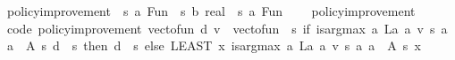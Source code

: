\begin{isabellebody}
\endisatagproof
{\isafoldproof}%
%
\isadelimproof
\isanewline
%
\endisadelimproof
\isanewline
{}\isamarkupfalse%
\ policy{\isacharunderscore}{\kern0pt}improvement{\isacharprime}{\kern0pt}\ {\isacharcolon}{\kern0pt}{\isacharcolon}{\kern0pt}\ {\isachardoublequoteopen}{\isacharparenleft}{\kern0pt}{\isacharprime}{\kern0pt}s{\isacharcomma}{\kern0pt}\ {\isacharprime}{\kern0pt}a{\isacharparenright}{\kern0pt}\ Fun\ {\isasymRightarrow}\ {\isacharparenleft}{\kern0pt}{\isacharprime}{\kern0pt}s\ {\isasymRightarrow}\isactrlsub b\ real{\isacharparenright}{\kern0pt}\ {\isasymRightarrow}\ {\isacharparenleft}{\kern0pt}{\isacharprime}{\kern0pt}s{\isacharcomma}{\kern0pt}\ {\isacharprime}{\kern0pt}a{\isacharparenright}{\kern0pt}\ Fun{\isachardoublequoteclose}\ \isanewline
\ \ \ policy{\isacharunderscore}{\kern0pt}improvement%
\isadelimproof
%
\endisadelimproof
%
\isatagproof
\isacommand{{\isachardot}{\kern0pt}}\isamarkupfalse%
%
\endisatagproof
{\isafoldproof}%
%
\isadelimproof
%
\endisadelimproof
\isanewline
\isanewline
{}\isamarkupfalse%
\ {\isacharbrackleft}{\kern0pt}code{\isacharbrackright}{\kern0pt}{\isacharcolon}{\kern0pt}\ {\isachardoublequoteopen}policy{\isacharunderscore}{\kern0pt}improvement{\isacharprime}{\kern0pt}\ {\isacharparenleft}{\kern0pt}vec{\isacharunderscore}{\kern0pt}to{\isacharunderscore}{\kern0pt}fun\ d{\isacharparenright}{\kern0pt}\ v\ {\isacharequal}{\kern0pt}\ vec{\isacharunderscore}{\kern0pt}to{\isacharunderscore}{\kern0pt}fun\ {\isacharparenleft}{\kern0pt}{\isasymchi}\ s{\isachardot}{\kern0pt}\ {\isacharparenleft}{\kern0pt}if\ is{\isacharunderscore}{\kern0pt}arg{\isacharunderscore}{\kern0pt}max\ {\isacharparenleft}{\kern0pt}{\isasymlambda}a{\isachardot}{\kern0pt}\ L\isactrlsub a\ a\ v\ s{\isacharparenright}{\kern0pt}\ {\isacharparenleft}{\kern0pt}{\isasymlambda}a{\isachardot}{\kern0pt}\ a\ {\isasymin}\ A\ s{\isacharparenright}{\kern0pt}\ {\isacharparenleft}{\kern0pt}d\ {\isachardollar}{\kern0pt}\ s{\isacharparenright}{\kern0pt}\ then\ d\ {\isachardollar}{\kern0pt}\ s\ else\ LEAST\ x{\isachardot}{\kern0pt}\ is{\isacharunderscore}{\kern0pt}arg{\isacharunderscore}{\kern0pt}max\ {\isacharparenleft}{\kern0pt}{\isasymlambda}a{\isachardot}{\kern0pt}\ L\isactrlsub a\ a\ v\ s{\isacharparenright}{\kern0pt}\ {\isacharparenleft}{\kern0pt}{\isasymlambda}a{\isachardot}{\kern0pt}\ a\ {\isasymin}\ A\ s{\isacharparenright}{\kern0pt}\ x{\isacharparenright}{\kern0pt}{\isacharparenright}{\kern0pt}{\isachardoublequoteclose}\isanewline
%
\isadelimproof
\ \ %
\endisadelimproof
%
\isatagproof

\end{isabellebody}
